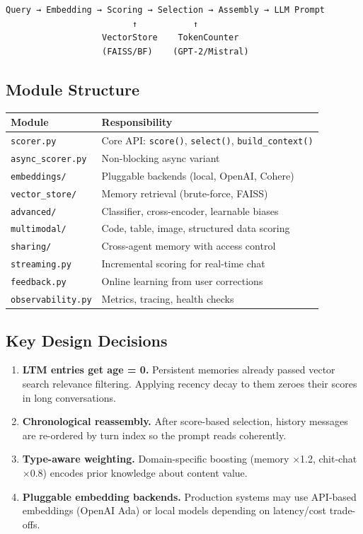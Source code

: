 \documentclass[11pt,a4paper]{article}
\begin{document}
\begin{verbatim}
Query → Embedding → Scoring → Selection → Assembly → LLM Prompt
                         ↑           ↑
                   VectorStore    TokenCounter
                   (FAISS/BF)    (GPT-2/Mistral)
\end{verbatim}

\subsection{Module Structure}

\begin{center}
\begin{tabular}{ll}
\toprule
Module & Responsibility \\
\midrule
\texttt{scorer.py} & Core API: \texttt{score()}, \texttt{select()}, \texttt{build\_context()} \\
\texttt{async\_scorer.py} & Non-blocking async variant \\
\texttt{embeddings/} & Pluggable backends (local, OpenAI, Cohere) \\
\texttt{vector\_store/} & Memory retrieval (brute-force, FAISS) \\
\texttt{advanced/} & Classifier, cross-encoder, learnable biases \\
\texttt{multimodal/} & Code, table, image, structured data scoring \\
\texttt{sharing/} & Cross-agent memory with access control \\
\texttt{streaming.py} & Incremental scoring for real-time chat \\
\texttt{feedback.py} & Online learning from user corrections \\
\texttt{observability.py} & Metrics, tracing, health checks \\
\bottomrule
\end{tabular}
\end{center}

\subsection{Key Design Decisions}

\begin{enumerate}
    \item \textbf{LTM entries get age = 0.} Persistent memories already passed
    vector search relevance filtering. Applying recency decay to them zeroes
    their scores in long conversations.
    \item \textbf{Chronological reassembly.} After score-based selection, history
    messages are re-ordered by turn index so the prompt reads coherently.
    \item \textbf{Type-aware weighting.} Domain-specific boosting (memory $\times$1.2,
    chit-chat $\times$0.8) encodes prior knowledge about content value.
    \item \textbf{Pluggable embedding backends.} Production systems may use API-based
    embeddings (OpenAI Ada) or local models depending on latency/cost trade-offs.
\end{enumerate}
\end{document}
